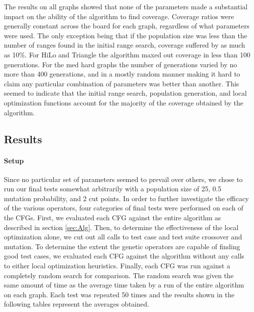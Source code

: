 \documentclass[runningheads]{llncs}
\begin{document}
The results on all graphs showed that none of the parameters made a substantial impact on the ability of the algorithm to find coverage. Coverage ratios were generally constant across the board for each graph, regardless of what parameters were used. The only exception being that if the population size was less than the number of ranges found in the initial range search, coverage suffered by as much as 10\%. For HiLo and Triangle the algorithm maxed out coverage in less than 100 generations. For the med hard graphs the number of generations varied by no more than 400 generations, and in a mostly random manner making it hard to claim any particular combination of parameters was better than another. This seemed to indicate that the initial range search, population generation, and local optimization functions account for the majority of the coverage obtained by the algorithm.

\subsection{Results}
\paragraph{Setup}Since no particular set of parameters seemed to prevail over others, we chose to run our final tests somewhat arbitrarily with a population size of 25, 0.5 mutation probability, and 2 cut points. In order to further investigate the efficacy of the various operators, four categories of final tests were performed on each of the CFGs. First, we evaluated each CFG against the entire algorithm as described in section \ref{sec:Alg}. Then, to determine the effectiveness of the local optimization alone, we cut out all calls to test case and test suite crossover and mutation. To determine the extent the genetic operators are capable of finding good test cases, we evaluated each CFG against the algorithm without any calls to either local optimization heuristics. Finally, each CFG was run against a completely random search for comparison. The random search was given the same amount of time as the average time taken by a run of the entire algorithm on each graph. Each test was repeated 50 times and the results shown in the following tables represent the averages obtained. 
\end{document}
